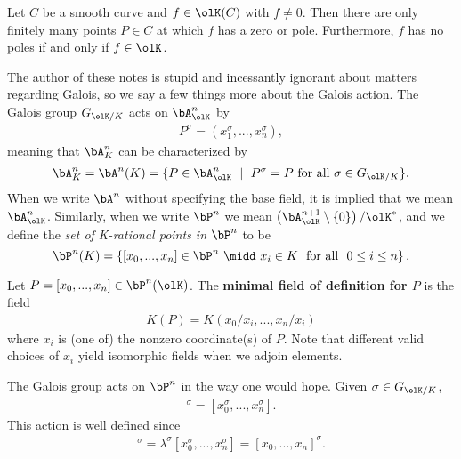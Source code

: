 \begin{prop}\label{prop:finitely-many-points-where-f-has-zero-or-pole}
	Let $C$ be a smooth curve and $f \in \olK(C)$ with $f \neq 0$. Then there are only finitely many points $P \in C$ at which $f$ has a zero or pole. Furthermore, $f$ has no poles if and only if $f \in \olK$.
\end{prop}

The author of these notes is stupid and incessantly ignorant about matters regarding Galois, so we say a few things more about the Galois action. The Galois group  $G_{\olK/K}$ acts on $\bA^n_{\olK}$ by
\begin{align*}
	P^\sigma = (x_1^\sigma,...,x_n^\sigma),
\end{align*}
meaning that $\bA^n_K$ can be characterized by
\begin{align*}
	\bA^n_K = \bA^n(K) = \{P \in \bA^n_{\olK} ~\mid~ P^\sigma = P \text{ for all } \sigma \in G_{\olK/K}\}.
\end{align*}
When we write  $\bA^n$ without specifying the base field, it is implied that we mean $\bA^n_{\olK}$. Similarly, when we write $\bP^n$ we mean  $\left(\bA^{n+1}_{\olK}\setminus\{0\}\right)/\olK^*$, and we define the \emph{set of K-rational points in } $\bP^n$ to be 
\begin{equation}\label{eqn:K-rational-P-points}
	\bP^n(K) = \left\{[x_0,...,x_n] \in \bP^n ~\midd~ x_i \in K ~\text{ for all } ~0\leq i\leq n\right\}.
\end{equation}
\begin{defn}\label{defn:minimal-field-of-definition-for-P}
	Let $P = [x_0,...,x_n]\in \bP^n(\olK)$. The \textbf{minimal field of definition for $P$} is the field
	\begin{align*}
		K(P) = K(x_0/x_i,...,x_n/x_i)
	\end{align*}
	where $x_i$ is (one of) the nonzero coordinate(s) of $P$. Note that different valid choices of $x_i$ yield isomorphic fields when we adjoin elements.
\end{defn}
The Galois group acts on $\bP^n$ in the way one would hope. Given $\sigma \in G_{\olK/K}$,
\begin{align*}
	[x_0,...,x_n]^{\sigma} = [x_0^\sigma,...,x_n^\sigma].
\end{align*}
This action is well defined since
\begin{align*}
	[\lambda x_0, ...,\lambda x_n]^\sigma = \lambda^\sigma[x_0^\sigma,...,x_n^\sigma] = [x_0,...,x_n]^\sigma.
\end{align*}

